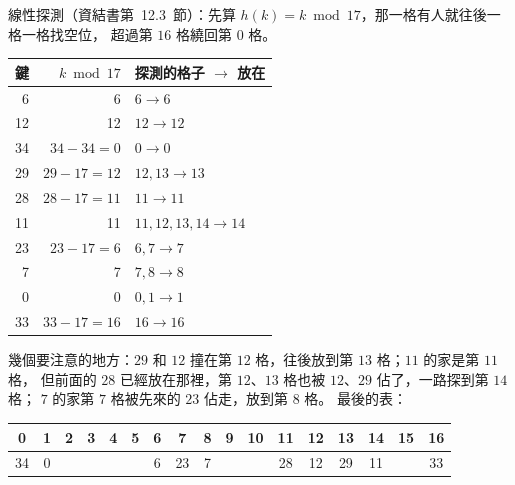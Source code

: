 \begin{pastsoln}
線性探測（資結書第~12.3~節）：先算 $h(k) = k \bmod 17$，那一格有人就往後一格一格找空位，
超過第 $16$ 格繞回第 $0$ 格。

\begin{center}
\begin{tabular}{rrl}
\toprule
鍵 & $k \bmod 17$ & 探測的格子 $\to$ 放在 \\
\midrule
6 & 6 & $6 \to 6$ \\
12 & 12 & $12 \to 12$ \\
34 & $34 - 34 = 0$ & $0 \to 0$ \\
29 & $29 - 17 = 12$ & $12, 13 \to 13$ \\
28 & $28 - 17 = 11$ & $11 \to 11$ \\
11 & 11 & $11, 12, 13, 14 \to 14$ \\
23 & $23 - 17 = 6$ & $6, 7 \to 7$ \\
7 & 7 & $7, 8 \to 8$ \\
0 & 0 & $0, 1 \to 1$ \\
33 & $33 - 17 = 16$ & $16 \to 16$ \\
\bottomrule
\end{tabular}
\end{center}

幾個要注意的地方：$29$ 和 $12$ 撞在第 $12$ 格，往後放到第 $13$ 格；$11$ 的家是第 $11$ 格，
但前面的 $28$ 已經放在那裡，第 $12$、$13$ 格也被 $12$、$29$ 佔了，一路探到第 $14$ 格；
$7$ 的家第 $7$ 格被先來的 $23$ 佔走，放到第 $8$ 格。 最後的表：

\begin{center}\small
\begin{tabular}{|*{17}{c|}}
\multicolumn{1}{c}{0} & \multicolumn{1}{c}{1} & \multicolumn{1}{c}{2} & \multicolumn{1}{c}{3} & \multicolumn{1}{c}{4} & \multicolumn{1}{c}{5} & \multicolumn{1}{c}{6} & \multicolumn{1}{c}{7} & \multicolumn{1}{c}{8} & \multicolumn{1}{c}{9} & \multicolumn{1}{c}{10} & \multicolumn{1}{c}{11} & \multicolumn{1}{c}{12} & \multicolumn{1}{c}{13} & \multicolumn{1}{c}{14} & \multicolumn{1}{c}{15} & \multicolumn{1}{c}{16}\\\hline
34 & 0 & & & & & 6 & 23 & 7 & & & 28 & 12 & 29 & 11 & & 33\\\hline
\end{tabular}
\end{center}
\end{pastsoln}
